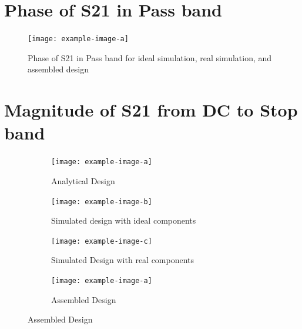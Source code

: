 \documentclass[letterpaper,12pt]{article}
\begin{document}
\newpage
\section{Phase of S21 in Pass band}
\begin{figure}[H]
    \texttt{[image: example-image-a]}
    \caption{Phase of S21 in Pass band for ideal simulation, real simulation, and assembled design}
\end{figure}

\newpage
\section{Magnitude of S21 from DC to Stop band}
\begin{figure}[H]
    \begin{subfigure}[t]{.49\textwidth}
      \centering
      \texttt{[image: example-image-a]}
      \caption{Analytical Design}
    \end{subfigure}
    \hfill
    \begin{subfigure}[t]{.49\textwidth}
      \centering
      \texttt{[image: example-image-b]}
      \caption{Simulated design with ideal components}
    \end{subfigure}
  
    \medskip
  
    \begin{subfigure}[t]{.49\textwidth}
      \centering
      \texttt{[image: example-image-c]}
      \caption{Simulated Design with real components}
    \end{subfigure}
    \hfill
    \begin{subfigure}[t]{.49\textwidth}
      \centering
      \texttt{[image: example-image-a]}
      \caption{Assembled Design}
    \end{subfigure}
  \end{figure}
\end{document}
